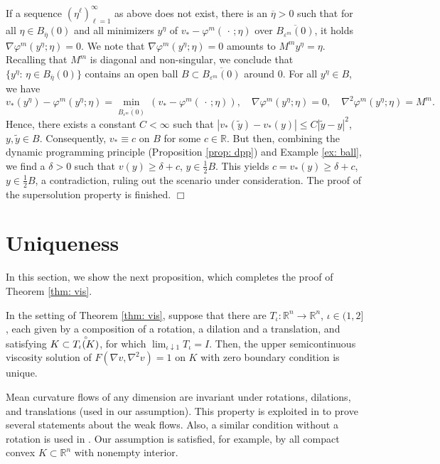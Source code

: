 \documentclass[11pt]{amsart}
\numberwithin{equation}{section}
\newcommand{\rr}{\mathbb{R}}
\newcommand{\ep}{\hfill $\Box$}
\begin{document}
\medskip

If a sequence $(\eta^\ell)_{\ell=1}^\infty$ as above does not exist, there is an $\overline{\eta}>0$ such that for all $\eta\in B_{\overline{\eta}}(0)$ and all minimizers $y^\eta$ of $v_*-\varphi^m(\,\cdot\,;\eta)$ over $\overline{B_{\varepsilon^m}(0)}$, it holds $\nabla\varphi^m(y^\eta;\eta)=0$. We note that $\nabla\varphi^m(y^\eta;\eta)=0$ amounts to $M^m y^\eta=\eta$. Recalling that $M^m$ is diagonal and non-singular, we conclude that $\{y^\eta:\,\eta\in B_{\overline{\eta}}(0)\}$ contains an open ball $B\subset \overline{B_{\varepsilon^m}(0)}$ around $0$. For all $y^\eta\in B$, we have
\begin{equation}
v_*(y^\eta)-\varphi^m(y^\eta;\eta)=\min_{\overline{B_{\varepsilon^m}(0)}}\, (v_*-\varphi^m(\,\cdot\,;\eta)),\quad
\nabla\varphi^m(y^\eta;\eta)=0,\quad
\nabla^2\varphi^m(y^\eta;\eta)=M^m.
\end{equation}
Hence, there exists a constant $C<\infty$ such that $|v_*(\widetilde{y})-v_*(y)|\le C|\widetilde{y}-y|^2$, $y,\widetilde{y}\in B$. Consequently, $v_*\equiv c$ on $B$ for some $c\in\rr$. But then, combining the dynamic programming principle (Proposition \ref{prop: dpp}) and Example \ref{ex: ball}, we find a $\delta>0$ such that $v(y)\ge\delta+c$, $y\in\frac{1}{2}B$. This yields $c=v_*(y)\ge\delta+c$, $y\in\frac{1}{2}B$, a contradiction, ruling out the scenario under consideration. The proof of the supersolution property is finished. \ep

\section{Uniqueness} \label{sec4}

In this section, we show the next proposition, which completes the proof of Theorem \ref{thm: vis}.

\begin{prop} \label{prop: uniq}
In the setting of Theorem \ref{thm: vis}, suppose that there are $T_\iota\!:\rr^n\to\rr^n$, $\iota\in(1,2]$, each given by a composition of a rotation, a dilation and a translation, and satisfying $K\subset \accentset{\circ}{T_\iota(K)}$, for which $\lim_{\iota\downarrow1} T_\iota=I$. Then, the upper semicontinuous viscosity solution of $F(\nabla v,\nabla^2v)=1$ on $K$ with zero boundary condition is unique.  	
\end{prop}

\begin{rmk}
Mean curvature flows of any dimension are invariant under rotations, dilations, and translations (used in our assumption). This property is exploited in \cite{BSS,SS} to prove several statements about the weak flows. Also, a similar condition without a rotation is used in \cite{larsson_minimum_2022}. Our assumption is satisfied, for example, by all compact convex $K\subset\rr^n$ with nonempty interior.


\end{rmk}
\end{document}
